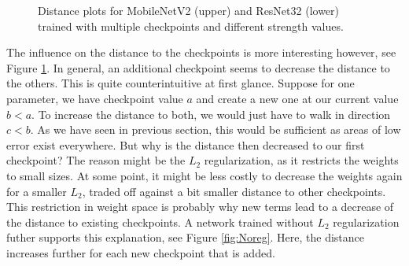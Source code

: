 \begin{figure}[H]
\begin{center}
        \caption{Distance plots for MobileNetV2 (upper) and ResNet32 (lower) trained with multiple checkpoints and different strength values.}
        \label{fig:Results_multiple_distance}
    \end{center}
\end{figure}

The influence on the distance to the checkpoints is more interesting however,
see Figure \ref{fig:Results_multiple_distance}. In general, an additional
checkpoint seems to decrease the distance to the others. This is quite
counterintuitive at first glance. Suppose for one parameter, we have checkpoint
value $a$ and create a new one at our current value $b<a$. To increase the
distance to both, we would just have to walk in direction $c<b$. As we have seen
in previous section, this would be sufficient as areas of low error exist
everywhere. But why is the distance then decreased to our first checkpoint? The
reason might be the $L_2$ regularization, as it restricts the weights to small
sizes. At some point, it might be less costly to decrease the weights again for
a smaller $L_2$, traded off against a bit smaller distance to other checkpoints.
This restriction in weight space is probably why new terms lead to a decrease of
the distance to existing checkpoints. A network trained without $L_2$
regularization futher supports this explanation, see Figure \ref{fig:Noreg}.
Here, the distance increases further for each new checkpoint that is added.




